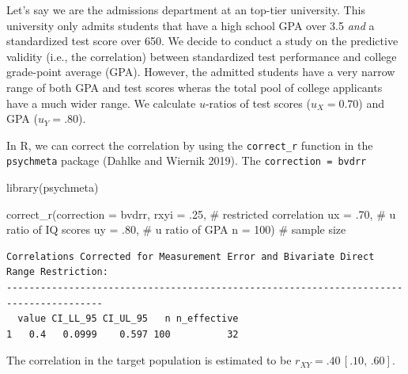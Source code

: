 \documentclass[
  letterpaper,
  DIV=11,
  numbers=noendperiod]{scrreprt}
\newenvironment{Shaded}{}{}
\newcommand{\AttributeTok}[1]{\textcolor[rgb]{0.00,0.34,0.68}{#1}}
\newcommand{\CommentTok}[1]{\textcolor[rgb]{0.54,0.53,0.53}{#1}}
\newcommand{\DecValTok}[1]{\textcolor[rgb]{0.69,0.50,0.00}{#1}}
\newcommand{\FunctionTok}[1]{\textcolor[rgb]{0.39,0.29,0.61}{#1}}
\newcommand{\NormalTok}[1]{\textcolor[rgb]{0.12,0.11,0.11}{#1}}
\newcommand{\StringTok}[1]{\textcolor[rgb]{0.75,0.01,0.01}{#1}}
\begin{document}
\begin{tcolorbox}[enhanced jigsaw, opacityback=0, coltitle=black, toprule=.15mm, colframe=quarto-callout-note-color-frame, bottomtitle=1mm, rightrule=.15mm, colbacktitle=quarto-callout-note-color!10!white, left=2mm, bottomrule=.15mm, breakable, title={Applied Example in R}, colback=white, opacitybacktitle=0.6, titlerule=0mm, arc=.35mm, leftrule=.75mm, toptitle=1mm]

Let's say we are the admissions department at an top-tier university.
This university only admits students that have a high school GPA over
3.5 \emph{and} a standardized test score over 650. We decide to conduct
a study on the predictive validity (i.e., the correlation) between
standardized test performance and college grade-point average (GPA).
However, the admitted students have a very narrow range of both GPA and
test scores wheras the total pool of college applicants have a much
wider range. We calculate \(u\)-ratios of test scores (\(u_{X}=0.70\))
and GPA (\(u_Y = .80\)).

In R, we can correct the correlation by using the \texttt{correct\_r}
function in the \texttt{psychmeta} package (Dahlke and Wiernik 2019).
The \texttt{correction\ =\ \textquotesingle{}bvdrr\textquotesingle{}}

\begin{Shaded}
\begin{Highlighting}[]
\FunctionTok{library}\NormalTok{(psychmeta)}

\FunctionTok{correct\_r}\NormalTok{(}\AttributeTok{correction =} \StringTok{\textquotesingle{}bvdrr\textquotesingle{}}\NormalTok{,}
          \AttributeTok{rxyi =}\NormalTok{ .}\DecValTok{25}\NormalTok{,  }\CommentTok{\# restricted correlation}
          \AttributeTok{ux =}\NormalTok{ .}\DecValTok{70}\NormalTok{,   }\CommentTok{\# u ratio of IQ scores}
          \AttributeTok{uy =}\NormalTok{ .}\DecValTok{80}\NormalTok{,   }\CommentTok{\# u ratio of GPA}
          \AttributeTok{n =} \DecValTok{100}\NormalTok{)    }\CommentTok{\# sample size}
\end{Highlighting}
\end{Shaded}

\begin{verbatim}
Correlations Corrected for Measurement Error and Bivariate Direct Range Restriction:
---------------------------------------------------------------------------------------
  value CI_LL_95 CI_UL_95   n n_effective
1   0.4   0.0999    0.597 100          32
\end{verbatim}

The correlation in the target population is estimated to be
\(r_{XY} = .40\, [.10,\, .60]\).

\end{tcolorbox}
\end{document}
